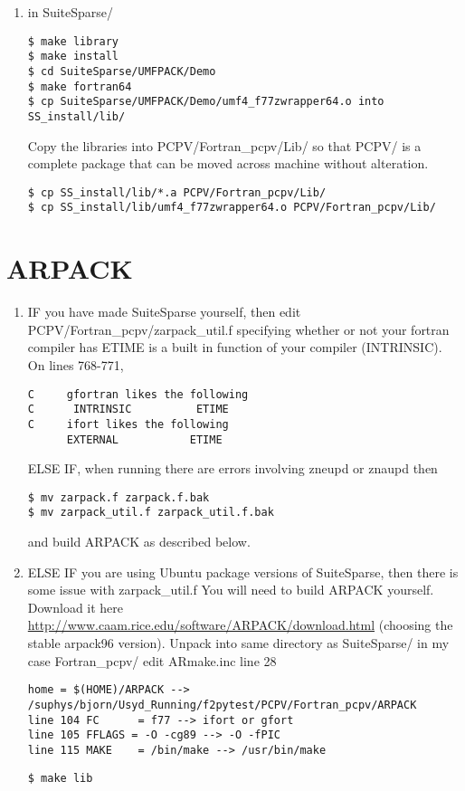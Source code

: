 \documentclass[11pt,a4paper,twoside]{report}
\begin{document}
\begin{enumerate}
\item in SuiteSparse/
\begin{lstlisting}
$ make library
$ make install
$ cd SuiteSparse/UMFPACK/Demo
$ make fortran64
$ cp SuiteSparse/UMFPACK/Demo/umf4_f77zwrapper64.o into SS_install/lib/
\end{lstlisting}
Copy the libraries into PCPV/Fortran\_pcpv/Lib/ so that PCPV/ is a complete package that can be moved across machine without alteration.

\begin{lstlisting}
$ cp SS_install/lib/*.a PCPV/Fortran_pcpv/Lib/
$ cp SS_install/lib/umf4_f77zwrapper64.o PCPV/Fortran_pcpv/Lib/
\end{lstlisting}
\end{enumerate}





\section{ARPACK}
\label{ARPACK}
\begin{enumerate}
\item IF you have made SuiteSparse yourself, then edit PCPV/Fortran\_pcpv/zarpack\_util.f 
specifying whether or not your fortran compiler has ETIME is a built in function of your compiler (INTRINSIC). On lines 768-771,
\begin{lstlisting}
C     gfortran likes the following
C      INTRINSIC          ETIME
C     ifort likes the following
      EXTERNAL           ETIME
\end{lstlisting}

ELSE IF, when running \CodeName there are errors involving zneupd or znaupd then
\begin{lstlisting}
$ mv zarpack.f zarpack.f.bak
$ mv zarpack_util.f zarpack_util.f.bak
\end{lstlisting}
and build ARPACK as described below.
 

\item ELSE IF you are using Ubuntu package versions of SuiteSparse, then there is some issue with zarpack\_util.f
You will need to build ARPACK yourself. Download it here \href{http://www.caam.rice.edu/software/ARPACK/download.html}{http://www.caam.rice.edu/software/ARPACK/download.html} (choosing the stable arpack96 version).
Unpack into same directory as SuiteSparse/ in my case Fortran\_pcpv/
edit ARmake.inc
line 28 
\begin{lstlisting}
home = $(HOME)/ARPACK --> /suphys/bjorn/Usyd_Running/f2pytest/PCPV/Fortran_pcpv/ARPACK
line 104 FC      = f77 --> ifort or gfort
line 105 FFLAGS = -O -cg89 --> -O -fPIC
line 115 MAKE    = /bin/make --> /usr/bin/make
\end{lstlisting}

\begin{lstlisting}
$ make lib
\end{lstlisting}
\end{enumerate}
\end{document}
